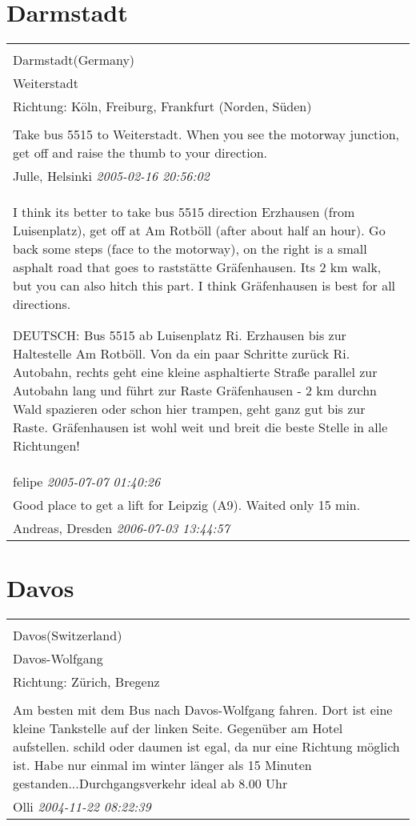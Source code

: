 \documentclass[a4paper,12pt]{article}
\begin{document}
\section{Darmstadt}
\begin{tabular}{|p{13cm}|}
\hline\\
Darmstadt(Germany)\\
Weiterstadt\\
Richtung: Köln, Freiburg, Frankfurt (Norden, Süden) \\
\hline\\
Take bus 5515 to Weiterstadt. When you see the motorway junction, get off and raise the thumb to your direction. \\
Julle, Helsinki \textit{ 2005-02-16 20:56:02 }\\\hline I think its better to take bus 5515 direction Erzhausen (from Luisenplatz), get off at Am Rotböll (after about half an hour). Go back some steps (face to the motorway), on the right is a small asphalt road that goes to raststätte Gräfenhausen. Its 2 km walk, but you can also hitch this part.
I think Gräfenhausen is best for all directions.

DEUTSCH:
Bus 5515 ab Luisenplatz Ri. Erzhausen bis zur Haltestelle Am Rotböll. Von da ein paar Schritte zurück Ri. Autobahn, rechts geht eine kleine asphaltierte Straße parallel zur Autobahn lang und führt zur Raste Gräfenhausen - 2 km durchn Wald spazieren oder schon hier trampen, geht ganz gut bis zur Raste.
Gräfenhausen ist wohl weit und breit die beste Stelle in alle Richtungen! \\
felipe \textit{ 2005-07-07 01:40:26 }\\\hline Good place to get a lift for Leipzig (A9). Waited only 15 min. \\
Andreas, Dresden \textit{ 2006-07-03 13:44:57 }\\\hline
\end{tabular}


\section{Davos}
\begin{tabular}{|p{13cm}|}
\hline\\
Davos(Switzerland)\\
Davos-Wolfgang\\
Richtung: Zürich, Bregenz \\
\hline\\
Am besten mit dem Bus nach Davos-Wolfgang fahren. Dort ist eine kleine Tankstelle auf der linken Seite. Gegenüber am Hotel aufstellen. schild oder daumen ist egal, da nur eine Richtung möglich ist. Habe nur einmal im winter länger als 15 Minuten gestanden...Durchgangsverkehr ideal ab 8.00 Uhr \\
Olli \textit{ 2004-11-22 08:22:39 }\\\hline
\end{tabular}
\end{document}
